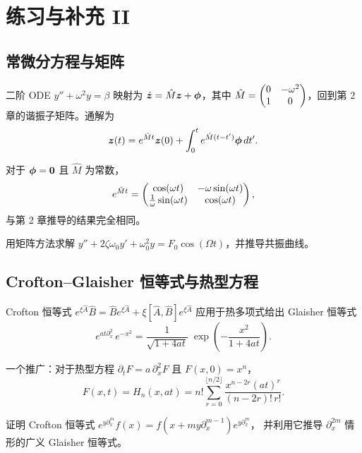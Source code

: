 \chapter{练习与补充 II}

\section{常微分方程与矩阵}

二阶 ODE $y''+\omega^2 y=\beta$ 映射为 $\dot{\bm{z}}=\hat M\bm{z}+\bm{\phi}$，其中
$\hat M=\begin{pmatrix}0&-\omega^2\\1&0\end{pmatrix}$，回到第 2 章的谐振子矩阵。通解为
\begin{equation}
\bm{z}(t) = e^{\hat M t}\bm{z}(0) + \int_0^t e^{\hat M(t-t')}\bm{\phi}\,dt'.
\label{eq:6.1.1}
\end{equation}

对于 $\bm{\phi}=\bm{0}$ 且 $\hat M$ 为常数，
\begin{equation}
e^{\hat M t} =
\begin{pmatrix}\cos(\omega t)&-\omega\sin(\omega t)\\
     \frac{1}{\omega}\sin(\omega t)&\cos(\omega t)\end{pmatrix},
\label{eq:6.1.2}
\end{equation}
与第 2 章推导的结果完全相同。

\begin{exercise}
用矩阵方法求解 $y''+2\zeta\omega_0 y'+\omega_0^2 y = F_0\cos(\Omega t)$，并推导共振曲线。
\end{exercise}

\section{Crofton--Glaisher 恒等式与热型方程}

Crofton 恒等式
$e^{\xi\hat A}\hat B = \hat B e^{\xi\hat A} + \xi[\hat A,\hat B]e^{\xi\hat A}$
应用于热多项式给出 Glaisher 恒等式
\begin{equation}
e^{at\partial_x^2}\,e^{-x^2}
= \frac{1}{\sqrt{1+4at}}\;
\exp\!\left(-\frac{x^2}{1+4at}\right).
\label{eq:6.2.1}
\end{equation}

一个推广：对于热型方程
$\partial_t F = a\,\partial_x^2 F$ 且 $F(x,0)=x^n$，
\begin{equation}
F(x,t) = H_n(x,at) = n!\sum_{r=0}^{\lfloor n/2\rfloor}
\frac{x^{n-2r}(at)^r}{(n-2r)!\,r!}.
\label{eq:6.2.2}
\end{equation}

\begin{exercise}
证明 Crofton 恒等式 $e^{y\partial_x^m}f(x)=f(x+my\partial_x^{m-1})e^{y\partial_x^m}$，
并利用它推导 $\partial_x^{2m}$ 情形的广义 Glaisher 恒等式。
\end{exercise}

